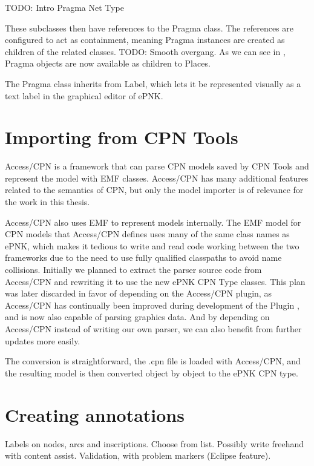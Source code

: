 TODO: Intro Pragma Net Type

These subclasses then have references to the Pragma class. The references are
configured to act as containment, meaning Pragma instances are created as
children of the related classes. TODO: Smooth overgang. As we can see in
, Pragma objects are now available as children to Places.


The Pragma class inherits from Label, which lets it be represented visually as a
text label in the graphical editor of ePNK.

\section{Importing from CPN Tools}
Access/CPN is a framework that can parse CPN models saved by CPN Tools and
represent the model with EMF classes. Access/CPN has many additional features
related to the semantics of CPN, but only the model importer is of relevance for
the work in this thesis.

Access/CPN also uses EMF to represent models internally. The EMF model for CPN
models that Access/CPN defines uses many of the same class names as ePNK, which
makes it tedious to write and read code working between the two frameworks due
to the need to use fully qualified classpaths to avoid name collisions.
Initially we planned to extract the parser source code from Access/CPN and
rewriting it to use the new ePNK CPN Type classes. This plan was later discarded in
favor of depending on the Access/CPN plugin, as Access/CPN has continually been
improved during development of the Plugin , and is now also
capable of parsing graphics data. And by depending on Access/CPN instead of writing
our own parser, we can also benefit from further updates more easily.

The conversion is straightforward, the .cpn file is loaded with Access/CPN,
and the resulting model is then converted object by object to the ePNK CPN type.

\section{Creating annotations}
Labels on nodes, arcs and inscriptions. 
Choose from list. Possibly write freehand with content assist. Validation, with
problem markers (Eclipse feature).

